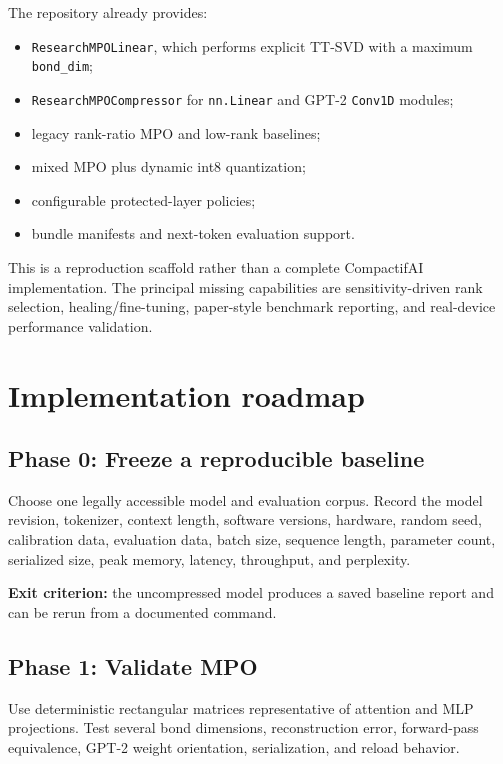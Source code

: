 \documentclass[11pt,a4paper]{article}
\begin{document}
The repository already provides:
\begin{itemize}[leftmargin=*]
  \item \texttt{ResearchMPOLinear}, which performs explicit TT-SVD with a
    maximum \texttt{bond\_dim};
  \item \texttt{ResearchMPOCompressor} for \texttt{nn.Linear} and GPT-2
    \texttt{Conv1D} modules;
  \item legacy rank-ratio MPO and low-rank baselines;
  \item mixed MPO plus dynamic int8 quantization;
  \item configurable protected-layer policies;
  \item bundle manifests and next-token evaluation support.
\end{itemize}

This is a reproduction scaffold rather than a complete CompactifAI
implementation. The principal missing capabilities are sensitivity-driven
rank selection, healing/fine-tuning, paper-style benchmark reporting, and
real-device performance validation.

\section{Implementation roadmap}

\subsection{Phase 0: Freeze a reproducible baseline}

Choose one legally accessible model and evaluation corpus. Record the model
revision, tokenizer, context length, software versions, hardware, random seed,
calibration data, evaluation data, batch size, sequence length, parameter
count, serialized size, peak memory, latency, throughput, and perplexity.

\textbf{Exit criterion:} the uncompressed model produces a saved baseline
report and can be rerun from a documented command.

\subsection{Phase 1: Validate MPO}

Use deterministic rectangular matrices representative of attention and MLP
projections. Test several bond dimensions, reconstruction error, forward-pass
equivalence, GPT-2 weight orientation, serialization, and reload behavior.
\end{document}
